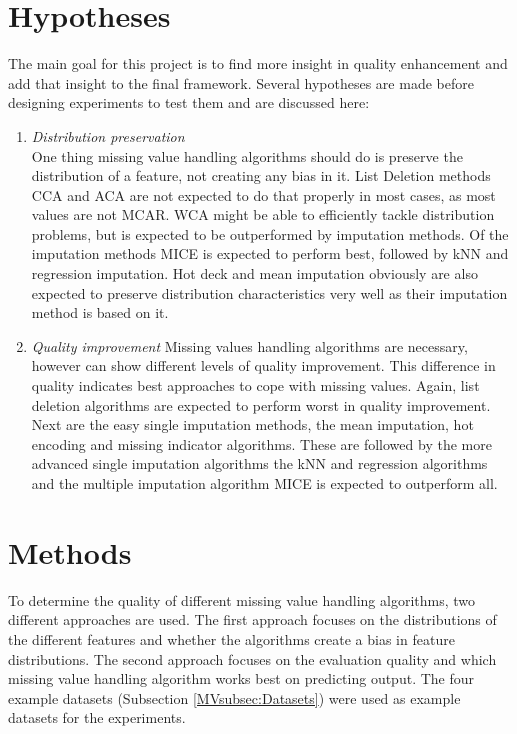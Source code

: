 \documentclass[10pt,a4paper]{report}
\begin{document}
	
	\section{Hypotheses}
	\label{MVsec:Hypothesis}
	
	The main goal for this project is to find more insight in quality enhancement and add that insight to the final framework. Several hypotheses are made before designing experiments to test them and are discussed here:
	
	\begin{enumerate}
		\item \textit{Distribution preservation} \\
		One thing missing value handling algorithms should do is preserve the distribution of a feature, not creating any bias in it. List Deletion methods CCA and ACA are not expected to do that properly in most cases, as most values are not MCAR. WCA might be able to efficiently tackle distribution problems, but is expected to be outperformed by imputation methods. Of the imputation methods MICE is expected to perform best, followed by kNN and regression imputation. Hot deck and mean imputation obviously are also expected to preserve distribution characteristics very well as their imputation method is based on it.
		\item \textit{Quality improvement}
		Missing values handling algorithms are necessary, however can show different levels of quality improvement. This difference in quality indicates best approaches to cope with missing values. Again, list deletion algorithms are expected to perform worst in quality improvement. Next are the easy single imputation methods, the mean imputation, hot encoding and missing indicator algorithms. These are followed by the more advanced single imputation algorithms the kNN and regression algorithms and the multiple imputation algorithm MICE is expected to outperform all.
	\end{enumerate}
	
	\section{Methods}
	\label{MVsec:Methods}
	
	To determine the quality of different missing value handling algorithms, two different approaches are used. The first approach focuses on the distributions of the different features and whether the algorithms create a bias in feature distributions. The second approach focuses on the evaluation quality and which missing value handling algorithm works best on predicting output. The four example datasets (Subsection \ref{MVsubsec:Datasets}) were used as example datasets for the experiments.
	
\end{document}
